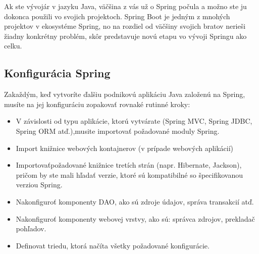 \documentclass[12pt, letterpaper]{article}
\begin{document}
	Ak ste vývojár v jazyku Java, väčšina z vás už o Spring počula a možno ste ju dokonca použili vo svojich projektoch. Spring Boot je jedným z mnohých projektov v ekosystéme Spring, no na rozdiel od väčšiny svojich bratov nerieši žiadny konkrétny problém, skôr predstavuje novú etapu vo vývoji Springu ako celku.
\subsection{Konfigurácia Spring}
	Zakaždým, keď vytvoríte ďalšiu podnikovú aplikáciu Java založenú na Spring, musíte na jej konfiguráciu zopakovať rovnaké rutinné kroky:

\begin{itemize}
	\item V závislosti od typu aplikácie, ktorú vytvárate (Spring MVC, Spring JDBC, Spring ORM atď.),musite importovať požadované moduly Spring.
	\item Import knižnice webových kontajnerov (v prípade webových aplikácií)
	\item Importovaťpožadované knižnice tretích strán (napr. Hibernate, Jackson), pričom by ste mali hľadať verzie, ktoré sú kompatibilné so špecifikovanou verziou Spring.
	\item Nakonfiguroť komponenty DAO, ako sú zdroje údajov, správa transakcií atď.
	\item Nakonfiguroť komponenty webovej vrstvy, ako sú: správca zdrojov, prekladač pohľadov.
	\item Definovat triedu, ktorá načíta všetky požadované konfigurácie.
\end{itemize}
	
\end{document}
